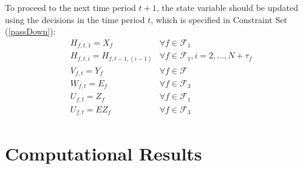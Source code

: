 \documentclass[12pt]{article}
\begin{document}
	To proceed to the next time period \(t+1\), the state variable should be updated using the decisions in the time period \(t\), which is specified in Constraint Set (\ref{passDown}):
	\begin{align*}
		& H_{f,t,1} = X_f & \forall f \in \mathcal{F}_1\\
		& H_{f,t,i} = H_{f,t-1,(i-1)} & \forall f \in \mathcal{F}_1, i = 2, \dots, N+\tau_f\\
		& V_{f,t} = Y_f & \forall f \in \mathcal{F}\\
		& W_{f,t} = E_f & \forall f \in \mathcal{F}_3\\
		& U_{f,t} = Z_f & \forall f \in \mathcal{F}_1\\
		& U_{f,t} = EZ_f & \forall f \in \mathcal{F}_3
	\end{align*}
	
\section{Computational Results}

\nocite{*}


\end{document}
